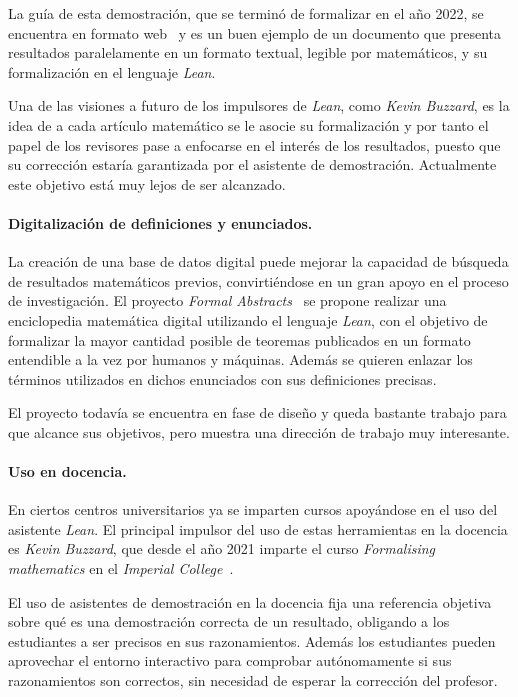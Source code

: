 La guía de esta demostración, que se terminó de formalizar en el año 2022, se
encuentra en formato web~\cite{scholzeBlueprintLiquidTensor} y es un buen
ejemplo de un documento que presenta resultados paralelamente en un formato
textual, legible por matemáticos, y su formalización en el lenguaje
\textit{Lean}.

Una de las visiones a futuro de los impulsores de \textit{Lean}, como
\textit{Kevin Buzzard}, es la idea de a cada artículo matemático se le asocie su
formalización y por tanto el papel de los revisores pase a enfocarse en el
interés de los resultados, puesto que su corrección estaría garantizada por el
asistente de demostración. Actualmente este objetivo está muy lejos de ser
alcanzado.

\paragraph{Digitalización de definiciones y enunciados.}

La creación de una base de datos digital puede mejorar la capacidad de búsqueda
de resultados matemáticos previos, convirtiéndose en un gran apoyo en el proceso
de investigación. El proyecto \textit{Formal Abstracts}~\cite{halesFormalAbstracts}
se propone realizar una enciclopedia matemática digital utilizando el lenguaje
\textit{Lean}, con el objetivo de formalizar la mayor cantidad posible de
teoremas publicados en un formato entendible a la vez por humanos y máquinas.
Además se quieren enlazar los términos utilizados en dichos enunciados con sus
definiciones precisas.

El proyecto todavía se encuentra en fase de diseño y queda bastante trabajo para
que alcance sus objetivos, pero muestra una dirección de trabajo muy
interesante.

\paragraph{Uso en docencia.}

En ciertos centros universitarios ya se imparten cursos apoyándose en el uso del
asistente \textit{Lean}. El principal impulsor del uso de estas herramientas en
la docencia es \textit{Kevin Buzzard}, que desde el año 2021 imparte el curso
\textit{Formalising mathematics} en el \textit{Imperial
	College}~\cite{buzzardFormalisingMathematicsFormalising}.

El uso de asistentes de demostración en la docencia fija una referencia objetiva
sobre qué es una demostración correcta de un resultado, obligando a los
estudiantes a ser precisos en sus razonamientos. Además los estudiantes pueden
aprovechar el entorno interactivo para comprobar autónomamente si sus
razonamientos son correctos, sin necesidad de esperar la corrección del
profesor.

